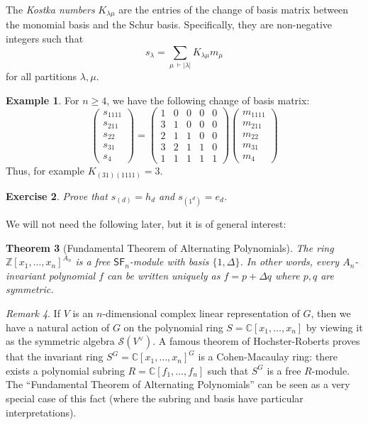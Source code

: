 \documentclass[12pt]{article}
\theoremstyle{plain}
\newtheorem{theorem}{Theorem}[section]
\newtheorem{exercise}[theorem]{Exercise}
\theoremstyle{definition}
\newtheorem{example}[theorem]{Example}
\theoremstyle{remark}
\newtheorem{remark}[theorem]{Remark}
\numberwithin{equation}{section}
\begin{document}
The \emph{Kostka numbers} $K_{\lambda \mu}$ are the entries of the
change of basis matrix between the monomial basis and the Schur basis.
Specifically, they are non-negative integers such that
\[
s_\lambda = \sum_{\mu\, \vdash |\lambda|} K_{\lambda \mu} m_\mu
\]
for all partitions $\lambda,\mu$.

\begin{example}
For $n \ge 4$, we have the following change of basis matrix:
\[
\begin{pmatrix}
s_{1111}\\ s_{211} \\ s_{22}\\ s_{31}\\ s_4
\end{pmatrix}
=
\begin{pmatrix}
1 & 0 & 0 & 0 & 0\\
3 & 1 & 0 & 0 & 0\\
2 & 1 & 1 & 0 & 0\\
3 & 2 & 1 & 1 & 0\\
1 & 1 & 1 & 1 & 1
\end{pmatrix} 
\begin{pmatrix}
m_{1111}\\ m_{211} \\ m_{22}\\ m_{31}\\ m_4
\end{pmatrix}
\]
Thus, for example $K_{(31)(1111)}=3$.
\end{example}

\begin{exercise}
Prove that $s_{(d)} = h_d$ and $s_{(1^d)} = e_d$.
\end{exercise}

We will not need the following later, but it is of general interest:

\begin{theorem}[Fundamental Theorem of Alternating Polynomials]
The ring $\mathbb{Z}[x_1,\ldots,x_n]^{A_n}$ is a free
$\mathsf{SF}_n$-module with basis $\{1, \Delta\}$.
In other words, every $A_n$-invariant polynomial $f$ can be written uniquely
as $f=p+\Delta q$ where $p,q$ are symmetric.
\end{theorem}

\begin{remark}
If $V$ is an $n$-dimensional complex linear representation of $G$,
then we have a natural action of $G$ on the polynomial ring
$S=\mathbb{C}[x_1,\ldots,x_n]$ by viewing it as the symmetric algebra
$\mathcal{S}(V^\vee)$.
A famous theorem of Hochster-Roberts proves that the invariant ring
$S^G=\mathbb{C}[x_1,\ldots,x_n]^G$ is a Cohen-Macaulay ring:
there exists a polynomial subring $R=\mathbb{C}[f_1,\ldots,f_n]$
such that $S^G$ is a free $R$-module.
The ``Fundamental Theorem of Alternating Polynomials'' can be seen as a
very special case of this fact (where the subring and basis have
particular interpretations).
\end{remark}
\end{document}

